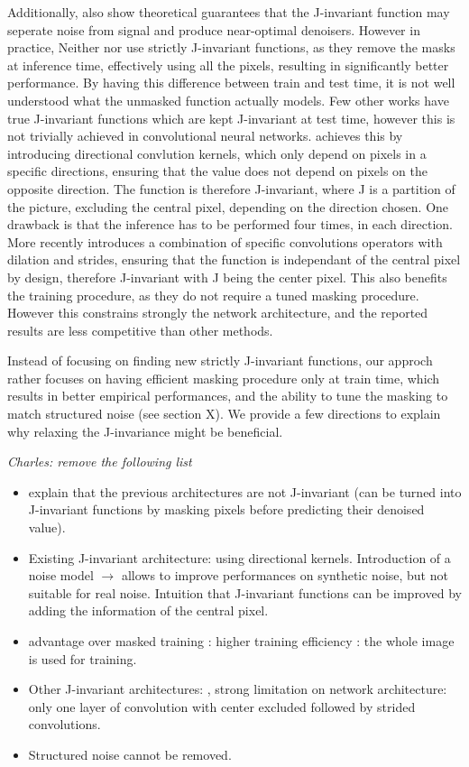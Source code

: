 \documentclass{article}
\begin{document}
Additionally, \cite{batson2019noise2self} also show theoretical guarantees that the J-invariant function may seperate noise from signal and produce near-optimal denoisers.
However in practice, Neither \cite{krull2018noise2void} nor \cite{batson2019noise2self} use strictly J-invariant functions, as they remove the masks at inference time,
effectively using all the pixels, resulting in significantly better performance. By having this difference between train and test time, it is not well understood what the unmasked function actually models.
Few other works have true J-invariant functions which are kept J-invariant at test time, however this is not trivially achieved in convolutional neural networks. \cite{laine2019high} achieves this by introducing directional convlution kernels, which only depend on pixels in a specific directions, ensuring that the value does not depend on pixels on the opposite direction. The function is therefore J-invariant, where J is a partition of the picture, excluding the central pixel, depending on the direction chosen. One drawback is that the inference has to be performed four times, in each direction. More recently \cite{lee2020noise2kernel} introduces a combination of specific convolutions operators with dilation and strides, ensuring that the function is independant of the central pixel by design, therefore J-invariant with J being the center pixel. This also benefits the training procedure, as they do not require a tuned masking procedure. However this constrains strongly the network architecture, and the reported results are less competitive than other methods.

Instead of focusing on finding new strictly J-invariant functions, our approch rather focuses on having efficient masking procedure only at train time, which results in better empirical performances, and the ability to tune the masking to match structured noise (see section X). We provide a few directions to explain why relaxing the J-invariance might be beneficial.

\textit{Charles: remove the following list}
\begin{itemize}
\item explain that the previous architectures are not J-invariant (can be turned into J-invariant functions by masking pixels before predicting their denoised value).
\item Existing J-invariant architecture: \cite{laine2019high} using directional kernels. Introduction of a noise model $\rightarrow$ allows to improve performances on synthetic noise, but not suitable for real noise. Intuition that J-invariant functions can be improved by adding the information of the central pixel.
\item advantage over masked training : higher training efficiency : the whole image is used for training.
\item Other J-invariant architectures: \cite{lee2020noise2kernel}, strong limitation on network architecture: only one layer of convolution with center excluded followed by strided convolutions.
\item Structured noise cannot be removed.
\end{itemize}
\end{document}
